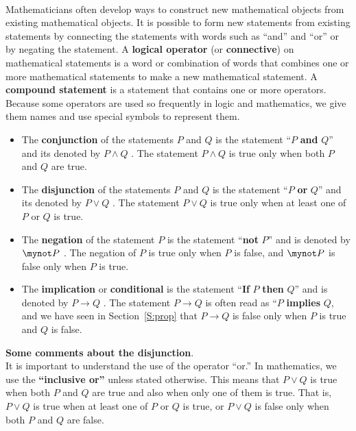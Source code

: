 \begin{previewactivity}\label{PA:compound} \hfill \\
Mathematicians often develop ways to construct new mathematical objects from existing mathematical objects.  It is possible to form new statements from existing statements by connecting the statements with words such as ``and'' and ``or'' or by negating the statement.  A \textbf{logical operator}
%
 (or \textbf{connective})
%
 on mathematical statements is a word or combination of words that combines one or more mathematical statements to make a new mathematical statement.  A \textbf{compound statement}
%
%
 is a statement that contains one or more operators.  Because some operators are used so frequently in logic and mathematics, we give them names and use special symbols to represent them.
\begin{itemize}
  \item The \textbf{conjunction}
%
 of the statements $P$ and $Q$ is the statement ``$P$ \textbf{and} $Q$'' and its denoted by $P \wedge Q$ \label{sym:and} .  The statement $P \wedge Q$ is true only when both $P$ and $Q$ are true.
  \item The \textbf{disjunction}
%
 of the statements $P$ and $Q$ is the statement ``$P$ \textbf{or} $Q$'' and its denoted by $P \vee Q$ \label{sym:or}.  The statement $P \vee Q$ is true only when at least one of $P$ or $Q$ is true.
  \item The \textbf{negation} 
%
of the statement $P$ is the statement ``\textbf{not} $P$'' and is denoted by $\mynot P$ \label{sym:not}.  The negation of $P$ is true only when $P$ is false, and $\mynot P$ is false only when $P$ is true.  
  \item The \textbf{implication} 
%
%
or \textbf{conditional} is the statement ``\textbf{If } $P$ \textbf{then} $Q$'' and is denoted by $P \to Q$ \label{sym:cond2}.  The statement $P \to Q$ is often read as ``$P$ \textbf{implies} $Q$, and we have seen in Section~\ref{S:prop} that $P \to Q$ is false only when $P$ is true and $Q$ is false.
\end{itemize}
\newpar
\textbf{Some comments about the disjunction}.  \\It is important to understand the use of the operator ``or.''  In mathematics, we use the \textbf{``inclusive or''}
%
 unless stated otherwise.  This means that  $P \vee Q$ is true when both  $P$  and  $Q$  are true and also when only one of them is true.  That is, $P \vee Q$  is true when at least one of  $P$  or  $Q$  is true, or $P \vee Q$  is false only when both $P$  and  $Q$  are false.


\end{previewactivity}
